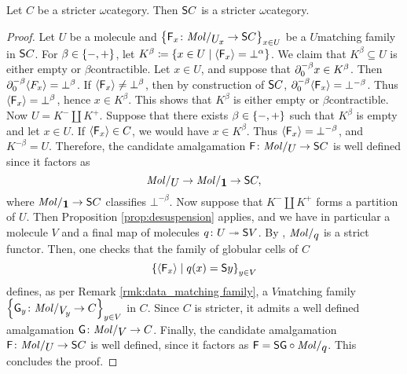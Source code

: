 \begin{thm} \label{thm:suspension_of_stricter}
    Let \( C \) be a stricter \( \omega \)\nbd category.
    Then \( \mathsf{S}{C} \) is a stricter \( \omega \)\nbd category.
\end{thm}
\begin{proof}
    Let \( U \) be a molecule and \( \set{\F_x \colon \molecin{\imel{U}{x}} \to \sus{C}}_{x \in U} \) be a \( U \)\nbd matching family in \( \mathsf{S}{C} \).
    For \( \beta \in \left\{ {-, +} \right\} \), let \( K^\beta \coloneqq \left\{ {x \in U \mid \langle\mathsf{F}_x\rangle = \bot^\alpha} \right\} \).
    We claim that \( K^\beta \subseteq U \) is either empty or \( \beta \)\nbd contractible.
    Let \( x \in U \), and suppose that \( \partial_{0}^{-\beta} x \in K^\beta \).
    Then \( \partial_{0}^{-\beta} \langle F_x\rangle = \bot^{\beta} \).
    If \( \langle\mathsf{F}_x\rangle \neq \bot^\beta \), then by construction of \( \mathsf{S}{C} \), \( \partial_{0}^{-\beta} \langle\mathsf{F}_x\rangle = \bot^{-\beta} \).
    Thus \( \langle\mathsf{F}_x\rangle = \bot^\beta \), hence \( x \in K^\beta \).
    This shows that \( K^\beta \) is either empty or \( \beta \)\nbd contractible.
    Now \( U = K^- \coprod K^+ \).
    Suppose that there exists \( \beta \in \left\{ {-, +} \right\} \) such that \( K^\beta \) is empty and let \( x \in U \).
    If \( \langle\mathsf{F}_x\rangle \in C \), we would have \( x \in K^\beta \).
    Thus \( \langle\mathsf{F}_x\rangle = \bot^{-\beta} \), and \( K^{-\beta} = U \).
    Therefore, the candidate amalgamation \( \F \colon \molecin{U} \to \sus{C} \) is well defined since it factors as
    \begin{equation*}
        \molecin{U} \to \molecin{\pt} \to \sus{C},
    \end{equation*}
    where \( \molecin{\pt} \to \sus{C} \) classifies \( \bot^{-\beta} \).
    Now suppose that \( K^- \coprod K^+ \) forms a partition of \( U \).
    Then Proposition \ref{prop:desuspension} applies, and we have in particular a molecule \( V \) and a final map of molecules \( q \colon U \twoheadrightarrow \mathsf{S}{V} \). 
    By \cite[Theorem 6.2.35]{hadzihasanovic2024combinatorics}, \( \molecin{q} \) is a strict functor.
    Then, one checks that the family of globular cells of \( C \)
    \begin{equation*}
        \left\{ {\langle\mathsf{F}_x\rangle \mid q(x) = \mathsf{S}{y}} \right\}_{y \in V}
    \end{equation*} 
    defines, as per Remark \ref{rmk:data_matching family}, a \( V \)\nbd matching family \( \set{\G_y \colon \molecin{\imel{V}{y}} \to C}_{y \in V} \) in \( C \).
    Since \( C \) is stricter, it admits a well defined amalgamation \( \G \colon \molecin{V} \to C \).
    Finally, the candidate amalgamation \( \F \colon \molecin{U} \to \sus{C} \) is well defined, since it factors as \( \F = \sus{\G} \after \molecin{q} \).
    This concludes the proof.
\end{proof}

